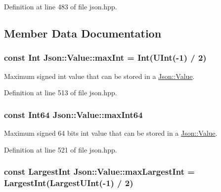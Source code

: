 Definition at line 483 of file json.\-hpp.



\subsection{Member Data Documentation}
\hypertarget{class_json_1_1_value_a978c799a8af3114ef7dab6fd0a310a1b}{
\subsubsection[{max\-Int}]{\setlength{\rightskip}{0pt plus 5cm}const {\bf Int} Json\-::\-Value\-::max\-Int = {\bf Int}({\bf U\-Int}(-\/1) / 2)\hspace{0.3cm}{\ttfamily [static]}}}\label{class_json_1_1_value_a978c799a8af3114ef7dab6fd0a310a1b}


Maximum signed int value that can be stored in a \hyperlink{class_json_1_1_value}{Json\-::\-Value}. 



Definition at line 513 of file json.\-hpp.

\hypertarget{class_json_1_1_value_a4492634870b8c5709ce967b384ac6006}{
\subsubsection[{max\-Int64}]{\setlength{\rightskip}{0pt plus 5cm}const {\bf Int64} Json\-::\-Value\-::max\-Int64\hspace{0.3cm}{\ttfamily [static]}}}\label{class_json_1_1_value_a4492634870b8c5709ce967b384ac6006}


Maximum signed 64 bits int value that can be stored in a \hyperlink{class_json_1_1_value}{Json\-::\-Value}. 



Definition at line 521 of file json.\-hpp.

\hypertarget{class_json_1_1_value_a8b4977696f13296fa8755c7953fafb2f}{
\subsubsection[{max\-Largest\-Int}]{\setlength{\rightskip}{0pt plus 5cm}const {\bf Largest\-Int} Json\-::\-Value\-::max\-Largest\-Int = {\bf Largest\-Int}({\bf Largest\-U\-Int}(-\/1) / 2)\hspace{0.3cm}{\ttfamily [static]}}}\label{class_json_1_1_value_a8b4977696f13296fa8755c7953fafb2f}


